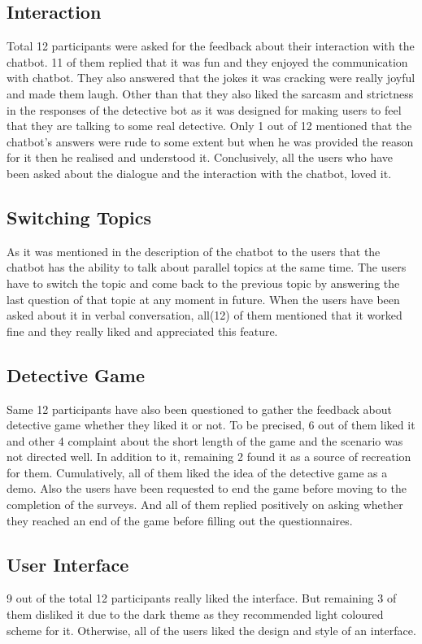 \subsection{Interaction}
Total 12 participants were asked for the feedback about their interaction with the chatbot. 11 of them replied that it was fun and they enjoyed the communication with chatbot. They also answered that the jokes it was cracking were really joyful and made them laugh. Other than that they also liked the sarcasm and strictness in the responses of the detective bot as it was designed for making users to feel that they are talking to some real detective. Only 1 out of 12 mentioned that the chatbot's answers were rude to some extent but when he was provided the reason for it then he realised and understood it. Conclusively, all the users who have been asked about the dialogue and the interaction with the chatbot, loved it.

\subsection{Switching Topics}
As it was mentioned in the description of the chatbot to the users that the chatbot has the ability to talk about parallel topics at the same time. The users have to switch the topic and come back to the previous topic by answering the last question of that topic at any moment in future. When the users have been asked about it in verbal conversation, all(12) of them mentioned that it worked fine and they really liked and appreciated this feature.

\subsection{Detective Game}
Same 12 participants have also been questioned to gather the feedback about detective game whether they liked it or not. To be precised, 6 out of them liked it and other 4 complaint about the short length of the game and the scenario was not directed well. In addition to it, remaining 2 found it as a source of recreation for them. Cumulatively, all of them liked the idea of the detective game as a demo. Also the users have been requested to end the game before moving to the completion of the surveys. And all of them replied positively on asking whether they reached an end of the game before filling out the questionnaires.

\subsection{User Interface}
9 out of the total 12 participants really liked the interface. But remaining 3 of them disliked it due to the dark theme as they recommended light coloured scheme for it. Otherwise, all of the users liked the design and style of an interface.  


